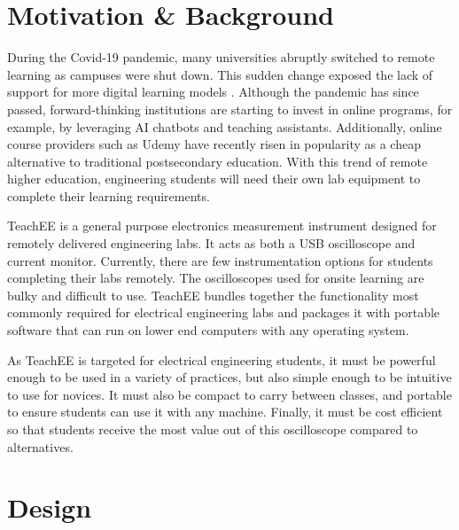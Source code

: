 \documentclass[letterpaper,11pt]{article}
\begin{document}
\section{Motivation \& Background}
During the Covid-19 pandemic, many universities abruptly switched to remote
learning as campuses were shut down. This sudden change exposed the lack of
support for more digital learning models \cite{online_learning}. Although the
pandemic has since passed, forward-thinking institutions are starting to invest
in online programs, for example, by leveraging AI chatbots and teaching assistants.
Additionally, online course providers such as Udemy have recently risen in popularity
as a cheap alternative to traditional postsecondary education. With this trend of
remote higher education, engineering students will need their own lab equipment to
complete their learning requirements.

TeachEE is a general purpose electronics measurement instrument
designed for remotely delivered engineering labs. It acts as both a
USB oscilloscope and current monitor. Currently, there are few instrumentation
options for students completing their labs remotely. The oscilloscopes used for
onsite learning are bulky and difficult to use. TeachEE bundles
together the functionality most commonly required for electrical engineering
labs and packages it with portable software that can run on lower end computers
with any operating system.

As TeachEE is targeted for electrical engineering students, it must be powerful
enough to be used in a variety of practices, but also simple enough to
be intuitive to use for novices. It must also be compact to carry between classes,
and portable to ensure students can use it with any machine. Finally, it must be
cost efficient so that students receive the most value out of this oscilloscope
compared to alternatives.

\section{Design}
\end{document}
